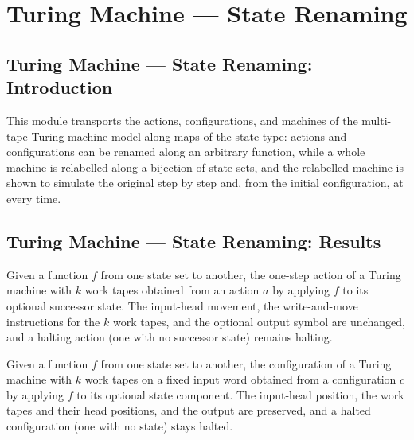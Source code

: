 \section{Turing Machine --- State Renaming}
\subsection*{Turing Machine --- State Renaming: Introduction}

This module transports the actions, configurations, and machines of the
multi-tape Turing machine model along maps of the state type: actions and
configurations can be renamed along an arbitrary function, while a whole
machine is relabelled along a bijection of state sets, and the relabelled
machine is shown to simulate the original step by step and, from the initial
configuration, at every time.

\subsection*{Turing Machine --- State Renaming: Results}

\begin{definition}
\label{Turing.Action.mapState}
\leanok
{}
Given a function $f$ from one state set to another, the one-step action of a
Turing machine with $k$ work tapes obtained from an action $a$ by applying
$f$ to its optional successor state.  The input-head movement, the
write-and-move instructions for the $k$ work tapes, and the optional output
symbol are unchanged, and a halting action (one with no successor state)
remains halting.
\end{definition}

\begin{definition}
\label{Turing.Cfg.mapState}
\leanok
{}
Given a function $f$ from one state set to another, the configuration of a
Turing machine with $k$ work tapes on a fixed input word obtained from a
configuration $c$ by applying $f$ to its optional state component.  The
input-head position, the work tapes and their head positions, and the output
are preserved, and a halted configuration (one with no state) stays halted.
\end{definition}

